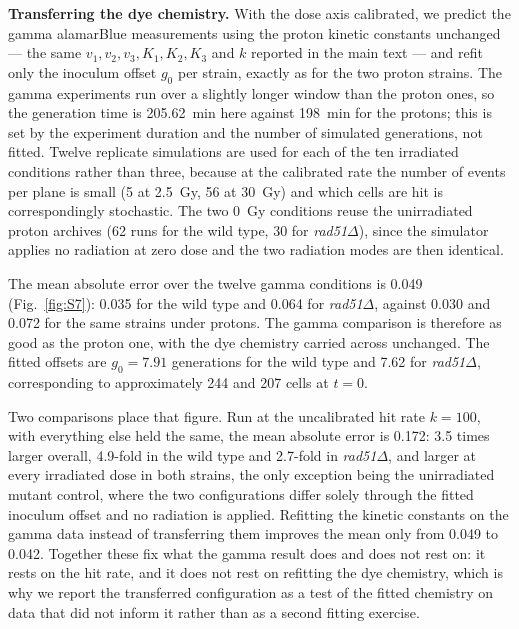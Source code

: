\documentclass[11pt]{article}
\begin{document}
\textbf{Transferring the dye chemistry.} With the dose axis calibrated, we predict
the gamma alamarBlue measurements using the proton kinetic constants unchanged ---
the same $v_1, v_2, v_3, K_1, K_2, K_3$ and $k$ reported in the main text --- and
refit only the inoculum offset $g_0$ per strain, exactly as for the two proton
strains. The gamma experiments run over a slightly longer window than the proton
ones, so the generation time is 205.62~min here against 198~min for the protons;
this is set by the experiment duration and the number of simulated generations, not
fitted. Twelve replicate simulations are used for each of the ten irradiated conditions
rather than three, because at the calibrated rate the number of events per plane is
small (5 at 2.5~Gy, 56 at 30~Gy) and which cells are hit is correspondingly
stochastic. The two 0~Gy conditions reuse the unirradiated proton archives (62 runs
for the wild type, 30 for \textit{rad51}$\Delta$), since the simulator applies no
radiation at zero dose and the two radiation modes are then identical.

The mean absolute error over the twelve gamma conditions is 0.049
(Fig.~\ref{fig:S7}): 0.035 for the wild type and 0.064 for
\textit{rad51}$\Delta$, against 0.030 and 0.072 for the same strains under
protons. The gamma comparison is therefore as good as the proton one, with the dye
chemistry carried across unchanged. The fitted offsets are
$g_0 = 7.91$ generations for the wild type and 7.62 for \textit{rad51}$\Delta$,
corresponding to approximately 244 and 207 cells at $t = 0$.

Two comparisons place that figure. Run at the uncalibrated hit rate $k = 100$,
with everything else held the same, the mean absolute error is 0.172: 3.5 times
larger overall, 4.9-fold in the wild type and 2.7-fold in
\textit{rad51}$\Delta$, and larger at every irradiated dose in both strains, the
only exception being the unirradiated mutant control, where the two
configurations differ solely through the fitted inoculum offset and no radiation
is applied. Refitting the kinetic constants on the gamma data instead of
transferring them improves the mean only from 0.049 to 0.042. Together these fix
what the gamma result does and does not rest on: it rests on the hit rate, and it
does not rest on refitting the dye chemistry, which is why we report the
transferred configuration as a test of the fitted chemistry on data that did not
inform it rather than as a second fitting exercise.
\end{document}
